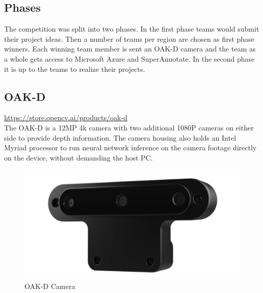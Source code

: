 \documentclass[a4paper,titlepage]{article}
\begin{document}
\subsection{Phases}

The competition was split into two phases.
In the first phase teams would submit their project ideas.
Then a number of teams per region are chosen as first phase winners.
Each winning team member is sent an OAK-D camera and the team as a whole gets access to Microsoft Azure and SuperAnnotate.
In the second phase it is up to the teams to realize their projects.

\subsection{OAK-D}

\href{https://store.opencv.ai/products/oak-d}{https://store.opencv.ai/products/oak-d} \\

The OAK-D is a 12MP 4k camera with two additional 1080P cameras on either side to provide depth information.
The camera housing also holds an Intel Myriad processor to run neural network inference on the camera footage directly on the device, without demanding the host PC.

\begin{figure}[H]
    \includegraphics[width=\textwidth]{oakd-camera.png}
    \caption{OAK-D Camera}
\end{figure}
\end{document}
